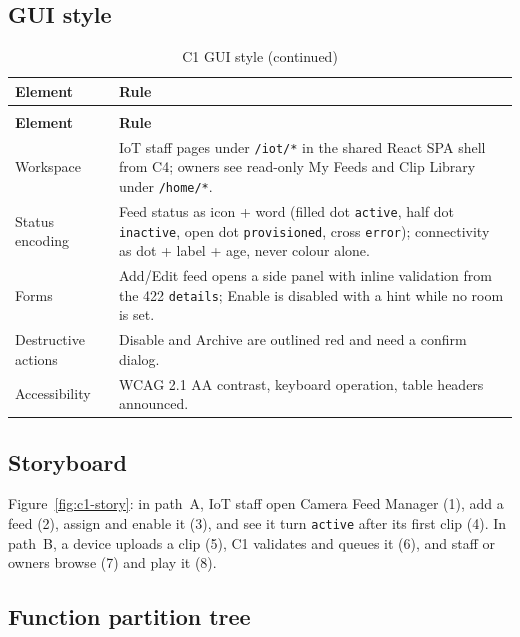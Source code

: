 \subsection{GUI style}
\begin{longtable}{L{3.0cm}L{11.8cm}}
\caption{C1 GUI style}\\
\toprule
\textbf{Element} & \textbf{Rule} \\
\midrule
\endfirsthead
\caption[]{C1 GUI style (continued)}\\
\toprule
\textbf{Element} & \textbf{Rule} \\
\midrule
\endhead
Workspace & IoT staff pages under \texttt{/iot/*} in the shared React SPA shell from C4; owners see read-only My Feeds and Clip Library under \texttt{/home/*}. \\
Status encoding & Feed status as icon + word (filled dot \texttt{active}, half dot \texttt{inactive}, open dot \texttt{provisioned}, cross \texttt{error}); connectivity as dot + label + age, never colour alone. \\
Forms & Add/Edit feed opens a side panel with inline validation from the 422 \texttt{details}; Enable is disabled with a hint while no room is set. \\
Destructive actions & Disable and Archive are outlined red and need a confirm dialog. \\
Accessibility & WCAG 2.1 AA contrast, keyboard operation, table headers announced. \\
\bottomrule
\end{longtable}

\subsection{Storyboard}
Figure~\ref{fig:c1-story}: in path~A, IoT staff open Camera Feed Manager (1), add a feed (2), assign and enable it (3),
and see it turn \texttt{active} after its first clip (4). In path~B, a device uploads a clip (5), C1 validates and
queues it (6), and staff or owners browse (7) and play it (8).


\subsection{Function partition tree}

